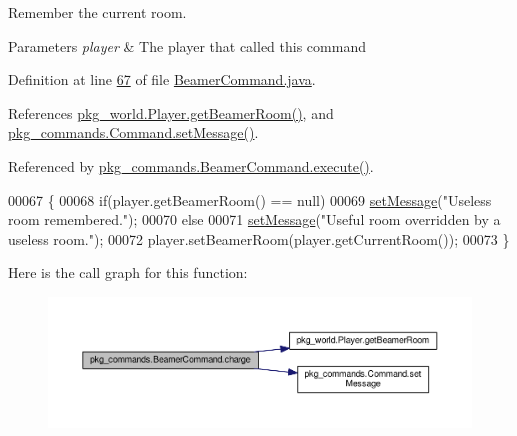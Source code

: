 Remember the current room. 


\begin{DoxyParams}{Parameters}
{\em player} & The player that called this command \\
\hline
\end{DoxyParams}


Definition at line \hyperlink{BeamerCommand_8java_source_l00067}{67} of file \hyperlink{BeamerCommand_8java_source}{Beamer\-Command.\-java}.



References \hyperlink{Player_8java_source_l00167}{pkg\-\_\-world.\-Player.\-get\-Beamer\-Room()}, and \hyperlink{Command_8java_source_l00089}{pkg\-\_\-commands.\-Command.\-set\-Message()}.



Referenced by \hyperlink{BeamerCommand_8java_source_l00030}{pkg\-\_\-commands.\-Beamer\-Command.\-execute()}.


\begin{DoxyCode}
00067                                       \{
00068         \textcolor{keywordflow}{if}(player.getBeamerRoom() == null)
00069             \hyperlink{classpkg__commands_1_1Command_ae210ff216fe908b111ba1c988a963d13}{setMessage}(\textcolor{stringliteral}{"Useless room remembered."});
00070         \textcolor{keywordflow}{else}
00071             \hyperlink{classpkg__commands_1_1Command_ae210ff216fe908b111ba1c988a963d13}{setMessage}(\textcolor{stringliteral}{"Useful room overridden by a useless room."});
00072         player.setBeamerRoom(player.getCurrentRoom());
00073     \}
\end{DoxyCode}


Here is the call graph for this function\-:
\nopagebreak
\begin{figure}[H]
\begin{center}
\leavevmode
\includegraphics[width=350pt]{classpkg__commands_1_1BeamerCommand_ae71665296a18d581ad1f714c1078e37b_cgraph}
\end{center}
\end{figure}




